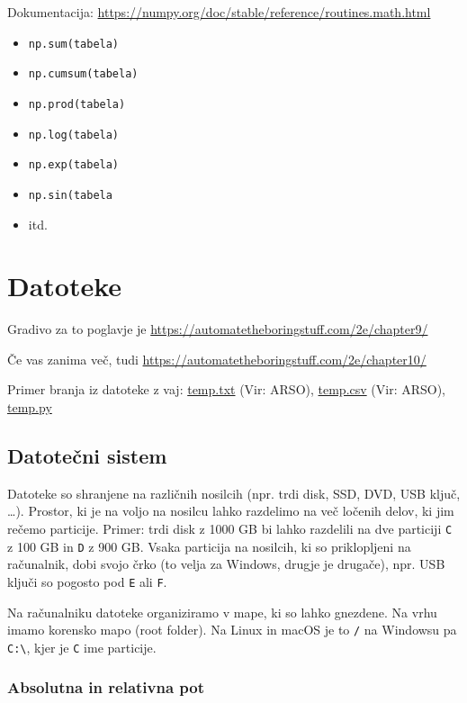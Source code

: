\documentclass[
]{report}
\providecommand{\tightlist}{%
  \setlength{\itemsep}{0pt}\setlength{\parskip}{0pt}}
\begin{document}
Dokumentacija: \url{https://numpy.org/doc/stable/reference/routines.math.html}

\begin{itemize}
\tightlist
\item
  \texttt{np.sum(tabela)}
\item
  \texttt{np.cumsum(tabela)}
\item
  \texttt{np.prod(tabela)}
\item
  \texttt{np.log(tabela)}
\item
  \texttt{np.exp(tabela)}
\item
  \texttt{np.sin(tabela}
\item
  itd.
\end{itemize}

\hypertarget{datoteke}{%
\chapter{Datoteke}\label{datoteke}}

Gradivo za to poglavje je \url{https://automatetheboringstuff.com/2e/chapter9/}

Če vas zanima več, tudi \url{https://automatetheboringstuff.com/2e/chapter10/}

Primer branja iz datoteke z vaj: \href{https://r2.rokuk.org/temp.txt}{temp.txt} (Vir: ARSO), \href{https://r2.rokuk.org/temp.csv}{temp.csv} (Vir: ARSO), \href{https://r2.rokuk.org/temp.py}{temp.py}

\hypertarget{datoteux10dni-sistem}{%
\section{Datotečni sistem}\label{datoteux10dni-sistem}}

Datoteke so shranjene na različnih nosilcih (npr. trdi disk, SSD, DVD, USB ključ, \ldots). Prostor, ki je na voljo na nosilcu lahko razdelimo
na več ločenih delov, ki jim rečemo particije. Primer: trdi disk z
1000 GB bi lahko razdelili na dve particiji \texttt{C} z 100 GB in \texttt{D} z 900 GB. Vsaka
particija na nosilcih, ki so priklopljeni na računalnik, dobi svojo črko
(to velja za Windows, drugje je drugače), npr.
USB ključi so pogosto pod \texttt{E} ali \texttt{F}.

Na računalniku datoteke organiziramo v mape, ki so lahko gnezdene. Na vrhu
imamo korensko mapo (root folder). Na Linux in macOS je to \texttt{/} na Windowsu pa
\texttt{C:\textbackslash{}}, kjer je \texttt{C} ime particije.

\hypertarget{absolutna-in-relativna-pot}{%
\subsection{Absolutna in relativna pot}\label{absolutna-in-relativna-pot}}
\end{document}
